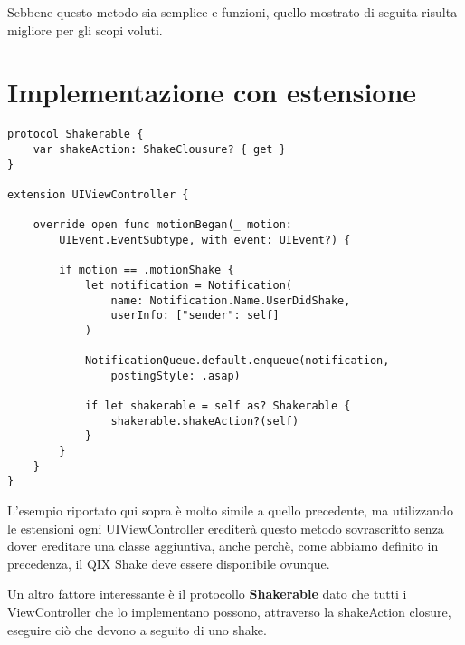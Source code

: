 Sebbene questo metodo sia semplice e funzioni, quello mostrato di seguita
risulta migliore per gli scopi voluti.

\section{Implementazione con estensione}

\begin{verbatim}
protocol Shakerable {
    var shakeAction: ShakeClousure? { get }
}

extension UIViewController {
   
    override open func motionBegan(_ motion:
        UIEvent.EventSubtype, with event: UIEvent?) {

        if motion == .motionShake {
            let notification = Notification(
                name: Notification.Name.UserDidShake,
                userInfo: ["sender": self]
            )
            
            NotificationQueue.default.enqueue(notification,
                postingStyle: .asap)
            
            if let shakerable = self as? Shakerable {
                shakerable.shakeAction?(self)
            }
        }
    }
}
\end{verbatim}

L'esempio riportato qui sopra è molto simile a quello precedente, ma utilizzando le estensioni
ogni UIViewController erediterà questo metodo sovrascritto senza dover ereditare 
una classe aggiuntiva, anche perchè, come abbiamo definito in precedenza, il QIX Shake deve essere disponibile
ovunque. 

Un altro fattore interessante è il protocollo \textbf{Shakerable} dato che tutti i ViewController che lo implementano
possono, attraverso la shakeAction closure, eseguire ciò che devono a seguito di uno shake.